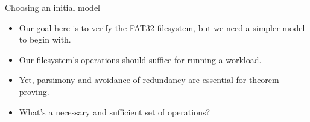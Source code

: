 \documentclass{beamer}
\begin{document}
\begin{frame}{Choosing an initial model}
  \begin{itemize}
    \item Our goal here is to verify the FAT32 filesystem, but we need
      a simpler model to begin with.
    \item Our filesystem's operations should suffice for running a
      workload.
    \item Yet, parsimony and avoidance of redundancy are essential for
      theorem proving.
    \item What's a necessary and sufficient set of operations?
  \end{itemize}
\end{frame}

\end{document}
